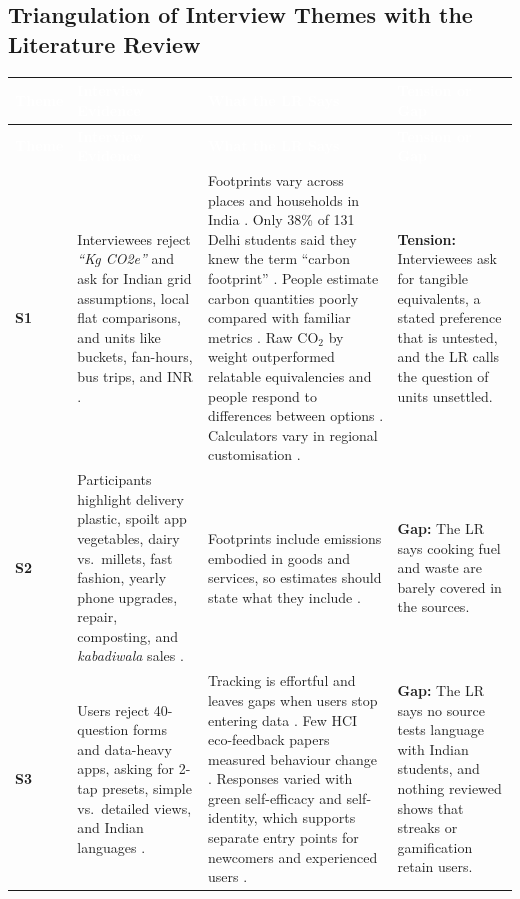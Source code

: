 \documentclass[12pt, a4paper]{article}
\begin{document}
\subsection*{Triangulation of Interview Themes with the Literature Review}
\begin{longtable}{|>{\raggedright\arraybackslash}p{1.2cm}|>{\raggedright\arraybackslash}p{4.5cm}|>{\raggedright\arraybackslash}p{5.5cm}|>{\raggedright\arraybackslash}p{4.3cm}|}
\hline
\rowcolor{cNavy}
\textcolor{white}{\textbf{Theme}} & \textcolor{white}{\textbf{Interview Evidence}} & \textcolor{white}{\textbf{What the LR Says}} & \textcolor{white}{\textbf{Tension or Gap}} \\
\hline
\endfirsthead
\hline
\rowcolor{cNavy}
\textcolor{white}{\textbf{Theme}} & \textcolor{white}{\textbf{Interview Evidence}} & \textcolor{white}{\textbf{What the LR Says}} & \textcolor{white}{\textbf{Tension or Gap}} \\
\hline
\endhead
\hline
\endfoot

\textbf{S1} & Interviewees reject \textit{``Kg CO2e''} and ask for Indian grid assumptions, local flat comparisons, and units like buckets, fan-hours, bus trips, and INR \cite{cf1, cf2, cf4, cf6, cf8}. & Footprints vary across places and households in India \cite{lee2021}. Only 38\% of 131 Delhi students said they knew the term ``carbon footprint'' \cite{gandhi2025}. People estimate carbon quantities poorly compared with familiar metrics \cite{grinstein2018}. Raw $\text{CO}_2$ by weight outperformed relatable equivalencies and people respond to differences between options \cite{mohanty2023}. Calculators vary in regional customisation \cite{mulrow2019}. & \textbf{Tension:} Interviewees ask for tangible equivalents, a stated preference that is untested, and the LR calls the question of units unsettled. \\
\hline

\textbf{S2} & Participants highlight delivery plastic, spoilt app vegetables, dairy vs.\ millets, fast fashion, yearly phone upgrades, repair, composting, and \textit{kabadiwala} sales \cite{cf1, cf2, cf3, cf4, cf5, cf7, cf8, cf10}. & Footprints include emissions embodied in goods and services, so estimates should state what they include \cite{shi2021}. & \textbf{Gap:} The LR says cooking fuel and waste are barely covered in the sources. \\
\hline

\textbf{S3} & Users reject 40-question forms and data-heavy apps, asking for 2-tap presets, simple vs.\ detailed views, and Indian languages \cite{cf1, cf2, cf3, cf4, cf7, cf8, cf9, cf10}. & Tracking is effortful and leaves gaps when users stop entering data \cite{hoffmann2024}. Few HCI eco-feedback papers measured behaviour change \cite{froehlich2010}. Responses varied with green self-efficacy and self-identity, which supports separate entry points for newcomers and experienced users \cite{hoffmann2024}. & \textbf{Gap:} The LR says no source tests language with Indian students, and nothing reviewed shows that streaks or gamification retain users. \\
\hline


\end{longtable}
\end{document}
